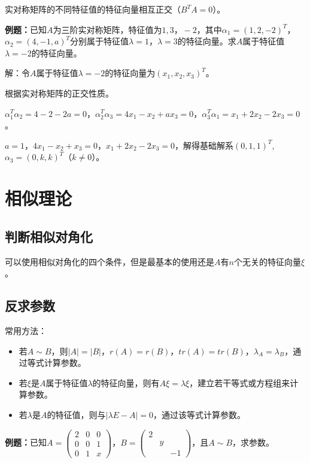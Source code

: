 \documentclass[UTF8, 12pt]{ctexart}
\begin{document}
实对称矩阵的不同特征值的特征向量相互正交（$B^TA=0$）。

\textbf{例题：}已知$A$为三阶实对称矩阵，特征值为$1,3，-2$，其中$\alpha_1=(1,2,-2)^T$，$\alpha_2=(4,-1,a)^T$分别属于特征值$\lambda=1$，$\lambda=3$的特征向量。求$A$属于特征值$\lambda=-2$的特征向量。

解：令$A$属于特征值$\lambda=-2$的特征向量为$(x_1,x_2,x_3)^T$。

根据实对称矩阵的正交性质。

$\alpha_1^T\alpha_2=4-2-2a=0$，$\alpha_2^T\alpha_3=4x_1-x_2+ax_3=0$，$\alpha_3^T\alpha_1=x_1+2x_2-2x_3=0$。

$a=1$，$4x_1-x_2+x_3=0$，$x_1+2x_2-2x_3=0$，解得基础解系$(0,1,1)^T$,$\alpha_3=(0,k,k)^T$（$k\neq0$）。

\section{相似理论}

\subsection{判断相似对角化}

可以使用相似对角化的四个条件，但是最基本的使用还是$A$有$n$个无关的特征向量$\xi$。

\subsection{反求参数}

常用方法：

\begin{itemize}
    \item 若$A\sim B$，则$\vert A\vert=\vert B\vert$，$r(A)=r(B)$，$tr(A)=tr(B)$，$\lambda_A=\lambda_B$，通过等式计算参数。
    \item 若$\xi$是$A$属于特征值$\lambda$的特征向量，则有$A\xi=\lambda\xi$，建立若干等式或方程组来计算参数。
    \item 若$\lambda$是$A$的特征值，则与$\vert\lambda E-A\vert=0$，通过该等式计算参数。
\end{itemize}

\textbf{例题：}已知$A=\left(\begin{array}{ccc}
    2 & 0 & 0 \\
    0 & 0 & 1 \\
    0 & 1 & x
\end{array}\right)$，$B=\left(\begin{array}{ccc}
    2 \\
     & y \\
     & & -1
\end{array}\right)$，且$A\sim B$，求参数。\medskip
\end{document}
